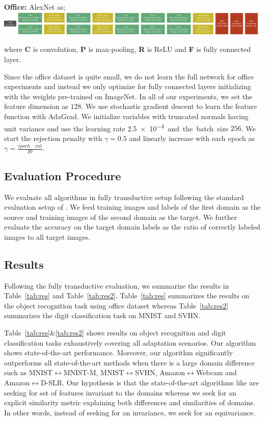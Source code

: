 \noindent \textbf{Office:} AlexNet\cite{alexnet} as; \includegraphics[width=0.55\columnwidth]{alexnet}

where \textbf{C} is convolution, \textbf{P} is max-pooling, \textbf{R} is ReLU and \textbf{F} is fully connected layer. 

Since the office dataset is quite small, we do not learn the full network for office experiments and instead we only optimize for fully connected layers initializing with the weights pre-trained on ImageNet. In all of our experiments, we set the feature dimension as $128$. We use stochastic gradient descent to learn the feature function with AdaGrad\cite{adagrad}. We initialize variables with truncated normals having unit variance and use the learning rate \SI{2.5e-4}  and the batch size $256$. We start the rejection penalty with $\gamma=0.5$ and linearly increase with each epoch as $\gamma=\frac{epoch\quad cnt}{20}$.

\subsection{Evaluation Procedure}
We evaluate all algorithms in fully transductive setup following the standard evaluation setup of \cite{office}.  We feed training images and labels of the first domain as the source and training images of the second domain as the target. We further evaluate the accuracy on the target domain labels as the ratio of correctly labeled images to all target images.

\subsection{Results}
Following the fully transductive evaluation, we summarize the results in Table~\ref{tab:res} and Table~\ref{tab:res2}. Table~\ref{tab:res} summarizes the results on the object recognition task using office dataset whereas  Table~\ref{tab:res2} summarizes the digit classification task on MNIST and SVHN.

Table~\ref{tab:res}\&\ref{tab:res2} shows results on object recognition and digit classification tasks exhaustively covering all adaptation scenarios. Our algorithm shows state-of-the-art performance. Moreover, our algorithm significantly outperforms all state-of-the-art methods when there is a large domain difference such as MNIST$\leftrightarrow$MNIST-M, MNIST$\leftrightarrow$SVHN, Amazon$\leftrightarrow$Webcam and Amazon$\leftrightarrow$D-SLR. Our hypothesis is that the state-of-the-art algorithms like \cite{ganin15} are seeking for set of features invariant to the domains whereas we seek for an explicit similarity metric explaining both differences and similarities of domains. In other words, instead of seeking for an invariance, we seek for an equivariance.

